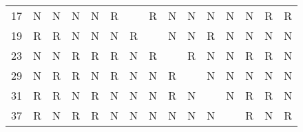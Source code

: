 \documentclass[17pt]{memoir}
\begin{document}
\begin{tabular}{c|cccccccccccccc}
17 & N                         & N                         & N                         & N                         & \cellcolor[HTML]{FAC22B}R & \cellcolor{black}         & \cellcolor[HTML]{FAC22B}R & N                         & N                         & N                         & N                         & N                         & \cellcolor[HTML]{FAC22B}R & \cellcolor[HTML]{FAC22B}R \\
19 & \cellcolor[HTML]{FAC22B}R & \cellcolor[HTML]{FAC22B}R & N                         & N                         & N                         & \cellcolor[HTML]{FAC22B}R & \cellcolor{black}         & N                         & N                         & \cellcolor[HTML]{FAC22B}R & N                         & N                         & N                         & N                         \\
23 & N                         & N                         & \cellcolor[HTML]{FAC22B}R & \cellcolor[HTML]{FAC22B}R & \cellcolor[HTML]{FAC22B}R & N                         & \cellcolor[HTML]{FAC22B}R & \cellcolor{black}         & \cellcolor[HTML]{FAC22B}R & N                         & N                         & \cellcolor[HTML]{FAC22B}R & \cellcolor[HTML]{FAC22B}R & N                         \\
29 & N                         & \cellcolor[HTML]{FAC22B}R & \cellcolor[HTML]{FAC22B}R & N                         & \cellcolor[HTML]{FAC22B}R & N                         & N                         & \cellcolor[HTML]{FAC22B}R & \cellcolor{black}         & N                         & N                         & N                         & N                         & N                         \\
31 & \cellcolor[HTML]{FAC22B}R & \cellcolor[HTML]{FAC22B}R & N                         & \cellcolor[HTML]{FAC22B}R & N                         & N                         & N                         & \cellcolor[HTML]{FAC22B}R & N                         & \cellcolor{black}         & N                         & \cellcolor[HTML]{FAC22B}R & \cellcolor[HTML]{FAC22B}R & N                         \\
37 & \cellcolor[HTML]{FAC22B}R & N                         & \cellcolor[HTML]{FAC22B}R & \cellcolor[HTML]{FAC22B}R & N                         & N                         & N                         & N                         & N                         & N                         & \cellcolor{black}         & \cellcolor[HTML]{FAC22B}R & N                         & \cellcolor[HTML]{FAC22B}R \\

\end{tabular}
\end{document}

